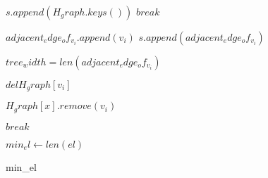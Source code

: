 \begin{algorithm}
\begin{algorithmic}[1]
                  \State $s.append(H_graph.keys())$
                  \State $break$
              \EndIf
              
              \State $adjacent_edge_of_v_i.append(v_i)$
              \State $s.append(adjacent_edge_of_v_i)$

                  \State $tree_width = len(adjacent_edge_of_v_i)$
              \EndIf
              
              \State $del H_graph[v_i]$

                      \State $H_graph[x].remove(v_i)$
                  \EndIf
              \EndFor

                  \State $break$
              \EndIf

          \EndIf
      \EndWhile

              \State $min_el \gets len(el)$
          \EndIf
      \EndFor

      \Return min_el
  \end{algorithmic}
  \end{algorithm}